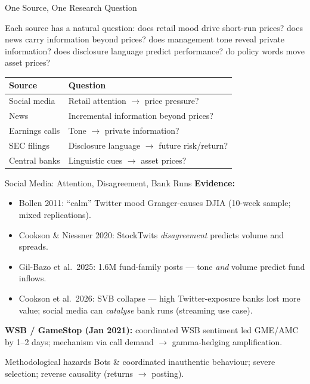 \documentclass[9pt,t]{beamer}
\begin{document}
\begin{frame}{One Source, One Research Question}
\begin{bigpicture}
Each source has a natural question: does retail mood drive short-run prices?
does news carry information beyond prices? does management tone reveal private
information? does disclosure language predict performance? do policy words move
asset prices?
\end{bigpicture}

\medskip
\begin{tabular}{ll}
\toprule
\textbf{Source} & \textbf{Question} \\
\midrule
Social media   & Retail attention $\to$ price pressure? \\
News           & Incremental information beyond prices? \\
Earnings calls & Tone $\to$ private information? \\
SEC filings    & Disclosure language $\to$ future risk/return? \\
Central banks  & Linguistic cues $\to$ asset prices? \\
\bottomrule
\end{tabular}
\end{frame}

\begin{frame}{Social Media: Attention, Disagreement, Bank Runs}
\textbf{Evidence:}
\begin{itemize}\small
  \item Bollen 2011: ``calm'' Twitter mood Granger-causes DJIA (10-week sample;
        mixed replications).
  \item Cookson \& Niessner 2020: StockTwits \emph{disagreement} predicts volume
        and spreads.
  \item Gil-Bazo et al.\ 2025: 1.6M fund-family posts --- tone \emph{and} volume
        predict fund inflows.
  \item Cookson et al.\ 2026: SVB collapse --- high Twitter-exposure banks lost
        more value; social media can \emph{catalyse} bank runs (streaming use case).
\end{itemize}

\medskip
\textbf{WSB / GameStop (Jan 2021):} coordinated WSB sentiment led GME/AMC by 1--2 days;
mechanism via call demand $\to$ gamma-hedging amplification.

\medskip
\begin{alertblock}{Methodological hazards}
Bots \& coordinated inauthentic behaviour; severe selection; reverse causality
(returns $\to$ posting).
\end{alertblock}
\end{frame}
\end{document}
